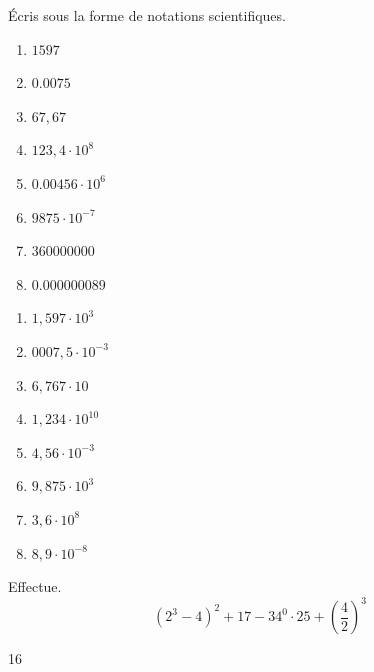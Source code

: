 \begin{exercise}
  Écris sous la forme de notations scientifiques.
  \begin{enumerate}[cols=2]
    \item $\num{1597}$
    \item $\num{0,0075}$
    \item $67,67$
    \item $123,4 \cdot 10^{8}$
    \item $\num{0.00456}\cdot 10^6$
    \item $\num{9875} \cdot 10^{- 7}$
    \item $\num{360000000}$
    \item $\num{0,000000089}$
  \end{enumerate}
\end{exercise}
\begin{solution}
  \begin{enumerate}[cols=4]
    \item $1,597\cdot 10^3$
    \item $0007,5\cdot 10^{-3}$
    \item $6,767\cdot 10 $
    \item $1,234\cdot 10^{10}$
    \item $4,56\cdot 10^{-3}$
    \item $9,875\cdot 10^3$
    \item $3,6\cdot 10^8$
    \item $8,9\cdot 10^{-8}$
  \end{enumerate}
\end{solution}

\begin{exercise}
  Effectue.
  \[\left( 2^{3} - 4 \right)^{2} + 17 - 34^{0} \cdot 25 + \left( \dfrac{4}{2} \right)^{3}\]
\end{exercise}
\begin{solution}
  16
\end{solution}

